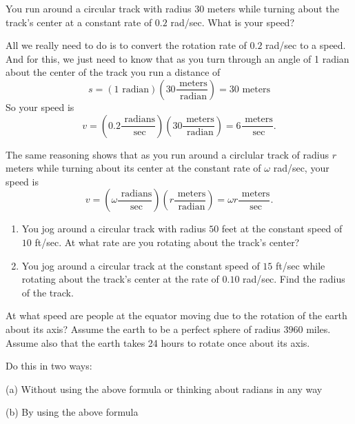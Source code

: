 \documentclass{ximera}
\begin{document}
\begin{question}  \label{Q2675: Angles}
You run around a circular track with radius $30$ meters while turning about the track's center at a constant rate of $0.2$ rad/sec. What is your speed?

\begin{explanation}
All we really need to do is to convert the rotation rate of $0.2$ rad/sec to a speed. And for this, we just need to know that 
as you turn through an angle of 1 radian about the center of the track you run a distance of 
\[
     s = (1 \text{ radian}) \left( 30 \frac{\text{ meters}}{\text{ radian}}\right) = 30 \text{ meters}
\]
So your speed is
\[
   v = \left( 0.2 \frac{\text{ radians}}{\text{ sec}}\right) \left( 30 \frac{\text{ meters}}{\text{ radian}}\right) = 6 \frac{\text{ meters}}{\text{ sec}}.
\]

The same reasoning shows that as you run around a circlular track of radius $r$ meters while turning about its center at the constant rate of $\omega$ rad/sec, your speed is
\[
   v = \left( \omega \frac{\text{ radians}}{\text{ sec}}\right) \left( r \frac{\text{ meters}}{\text{ radian}}\right) = \omega r \frac{\text{ meters}}{\text{ sec}}.
\]


\end{explanation}
\end{question}


\begin{question} \label{Qdft677788877}
\begin{enumerate}

\item You jog around a circular track with radius $50$ feet at the constant speed of $10$ ft/sec. At what rate are you rotating about the track's center?

\item You jog around a circular track at the constant speed of $15$ ft/sec while rotating about the track's center at the rate of $0.10$ rad/sec. Find the radius of the track.


\end{enumerate}
\end{question}




\begin{question}  \label{Q255: Angles}
At what speed are people at the equator moving due to the rotation of the earth about its axis? Assume the earth to be a perfect sphere of radius $3960$ miles. Assume also that the earth takes 24 hours to rotate once about its axis.

Do this in two ways:

(a) Without using the above formula or thinking about radians in any way

(b) By using the above formula

\end{question}
\end{document}
